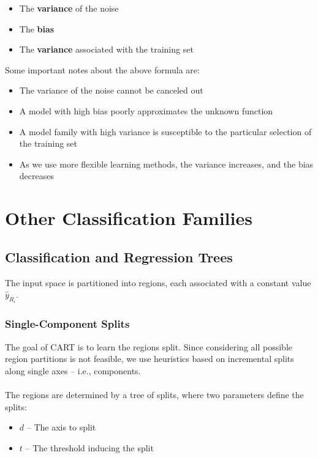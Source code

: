 \documentclass{article}
\begin{document}
\begin{itemize}
	\item The \textbf{variance} of the noise
	\item The \textbf{bias}
	\item The \textbf{variance} associated with the training set
\end{itemize}
Some important notes about the above formula are:

\begin{itemize}
	\item The variance of the noise cannot be canceled out
	\item A model with high bias poorly approximates the unknown function
	\item A model family with high variance is susceptible to the particular selection of the training set
	\item As we use more flexible learning methods, the variance increases, and the bias decreases
\end{itemize}

\section{Other Classification Families}
\subsection{Classification and Regression Trees}
The input space is partitioned into regions, each associated with a constant value $\hat y_{R_i}$.

\subsubsection{Single-Component Splits}
The goal of CART is to learn the regions split. Since considering all possible region partitions is not feasible, we use heuristics based on incremental splits along single axes -- i.e., components. \\ \\
The regions are determined by a tree of splits, where two parameters define the splits:

\begin{itemize}
	\item $d$ -- The axis to split
	\item $t$ -- The threshold inducing the split
\end{itemize}
\end{document}
